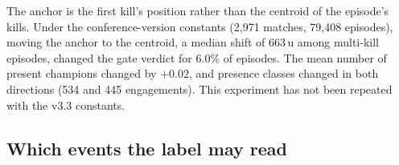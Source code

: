 The anchor is the first kill's position rather than the centroid of the episode's kills. Under the
conference-version constants (2,971 matches, 79,408 episodes), moving the anchor to the centroid, a
median shift of 663\,u among multi-kill episodes, changed the gate verdict for 6.0\% of episodes. The
mean number of present champions changed by $+0.02$, and presence classes changed in both directions
(534 and 445 engagements). This experiment has not been repeated with the v3.3 constants.

\subsection{Which events the label may read}\label{sec:def-attribution}

